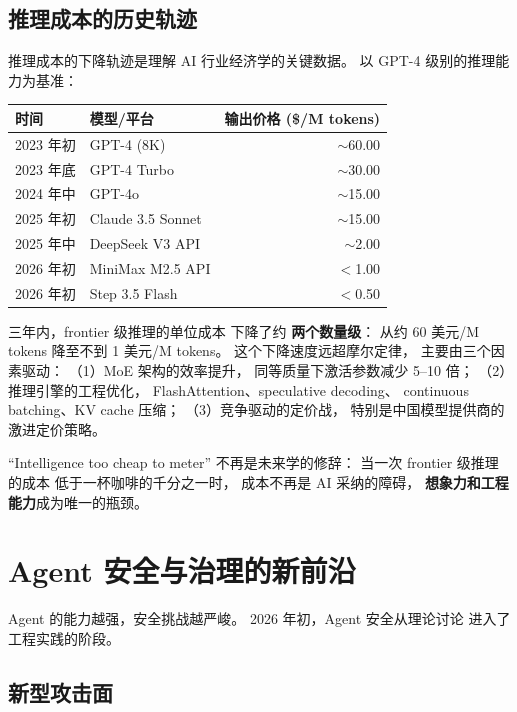 \subsection{推理成本的历史轨迹}

推理成本的下降轨迹是理解 AI 行业经济学的关键数据。
以 GPT-4 级别的推理能力为基准：

\begin{center}\small
\renewcommand{\arraystretch}{1.3}
\begin{tabular}{llr}
  \toprule
  \rowcolor{figLightGray}
  \textbf{时间} & \textbf{模型/平台} & \textbf{输出价格 (\$/M tokens)} \\
  \midrule
  2023 年初 & GPT-4 (8K) & $\sim$60.00 \\
  2023 年底 & GPT-4 Turbo & $\sim$30.00 \\
  2024 年中 & GPT-4o & $\sim$15.00 \\
  2025 年初 & Claude 3.5 Sonnet & $\sim$15.00 \\
  2025 年中 & DeepSeek V3 API & $\sim$2.00 \\
  2026 年初 & MiniMax M2.5 API & $<$1.00 \\
  2026 年初 & Step 3.5 Flash & $<$0.50 \\
  \bottomrule
\end{tabular}
\end{center}

三年内，frontier 级推理的单位成本
下降了约 \textbf{两个数量级}：
从约 60 美元/M tokens 降至不到 1 美元/M tokens。
这个下降速度远超摩尔定律，
主要由三个因素驱动：
（1）MoE 架构的效率提升，
同等质量下激活参数减少 5--10 倍；
（2）推理引擎的工程优化，
FlashAttention、speculative decoding、
continuous batching、KV cache 压缩；
（3）竞争驱动的定价战，
特别是中国模型提供商的激进定价策略。

“Intelligence too cheap to meter”
不再是未来学的修辞：
当一次 frontier 级推理的成本
低于一杯咖啡的千分之一时，
成本不再是 AI 采纳的障碍，
\textbf{想象力和工程能力}成为唯一的瓶颈。


\section{Agent 安全与治理的新前沿}
\label{sec:agent-safety}

Agent 的能力越强，安全挑战越严峻。
2026 年初，Agent 安全从理论讨论
进入了工程实践的阶段。

\subsection{新型攻击面}

